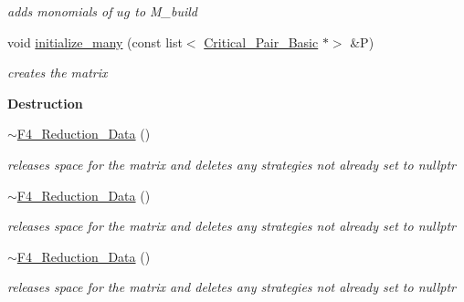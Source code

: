 \begin{Indent}
\begin{DoxyCompactItemize}
\begin{DoxyCompactList}\small\item\em adds monomials of $ ug $ to {\ttfamily M\+\_\+build} \end{DoxyCompactList}\item 
void \hyperlink{group___g_b_computation_a0fd30b42c2dcf0dd07dfa898f71c8751}{initialize\+\_\+many} (const list$<$ \hyperlink{group___g_b_computation_class_critical___pair___basic}{Critical\+\_\+\+Pair\+\_\+\+Basic} $\ast$$>$ \&P)
\begin{DoxyCompactList}\small\item\em creates the matrix \end{DoxyCompactList}\end{DoxyCompactItemize}
\end{Indent}
\begin{Indent}\textbf{ Destruction}\par
\begin{DoxyCompactItemize}
\item 
\mbox{\label{group___g_b_computation_a6806b4da4f0bc2753ba5a775794f9165}} 
\hyperlink{group___g_b_computation_a6806b4da4f0bc2753ba5a775794f9165}{$\sim$\+F4\+\_\+\+Reduction\+\_\+\+Data} ()
\begin{DoxyCompactList}\small\item\em releases space for the matrix and deletes any strategies not already set to {\ttfamily nullptr} \end{DoxyCompactList}\item 
\mbox{\label{group___g_b_computation_a6806b4da4f0bc2753ba5a775794f9165}} 
\hyperlink{group___g_b_computation_a6806b4da4f0bc2753ba5a775794f9165}{$\sim$\+F4\+\_\+\+Reduction\+\_\+\+Data} ()
\begin{DoxyCompactList}\small\item\em releases space for the matrix and deletes any strategies not already set to {\ttfamily nullptr} \end{DoxyCompactList}\item 
\mbox{\label{group___g_b_computation_a6806b4da4f0bc2753ba5a775794f9165}} 
\hyperlink{group___g_b_computation_a6806b4da4f0bc2753ba5a775794f9165}{$\sim$\+F4\+\_\+\+Reduction\+\_\+\+Data} ()
\begin{DoxyCompactList}\small\item\em releases space for the matrix and deletes any strategies not already set to {\ttfamily nullptr} \end{DoxyCompactList}\end{DoxyCompactItemize}
\end{Indent}
